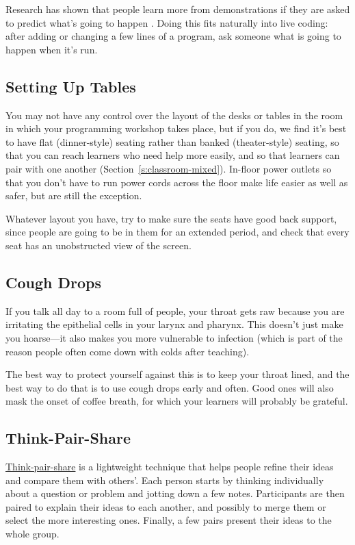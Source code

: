 Research has shown that people learn more from demonstrations if they
are asked to predict what's going to happen \cite{Mill2013}. Doing
this fits naturally into live coding: after adding or changing a few
lines of a program, ask someone what is going to happen when it's run.

\subsection{Setting Up Tables}\label{setting-up-tables}

You may not have any control over the layout of the desks or tables in
the room in which your programming workshop takes place, but if you do,
we find it's best to have flat (dinner-style) seating rather than banked
(theater-style) seating, so that you can reach learners who need help
more easily, and so that learners can pair with one another
(Section~\ref{s:classroom-mixed}). In-floor power outlets so that you
don't have to run power cords across the floor make life easier as
well as safer, but are still the exception.

Whatever layout you have, try to make sure the seats have good back
support, since people are going to be in them for an extended period,
and check that every seat has an unobstructed view of the screen.

\subsection{Cough Drops}\label{cough-drops}

If you talk all day to a room full of people, your throat gets raw
because you are irritating the epithelial cells in your larynx and
pharynx. This doesn't just make you hoarse---it also makes you more
vulnerable to infection (which is part of the reason people often come
down with colds after teaching).

The best way to protect yourself against this is to keep your throat
lined, and the best way to do that is to use cough drops early and
often. Good ones will also mask the onset of coffee breath, for which
your learners will probably be grateful.

\subsection{Think-Pair-Share}\label{think-pair-share}

\protect\hyperlink{g:think-pair-share}{Think-pair-share} is a lightweight technique
that helps people refine their ideas and compare them with
others'. Each person starts by thinking individually about a question
or problem and jotting down a few notes. Participants are then paired
to explain their ideas to each another, and possibly to merge them or
select the more interesting ones. Finally, a few pairs present their
ideas to the whole group.

